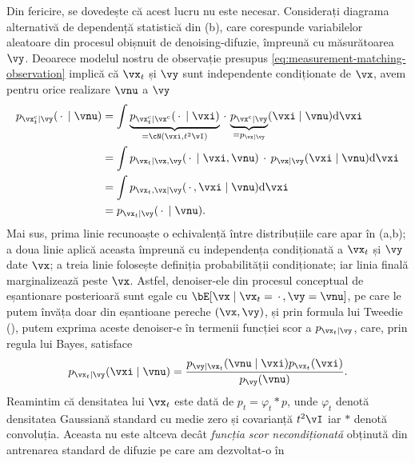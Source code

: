\documentclass[../../book-main_ro.tex]{subfiles}
\begin{document}
Din fericire, se dovedește că acest lucru nu este necesar.
Considerați diagrama alternativă de dependență statistică din
(b), care corespunde variabilelor aleatoare
din procesul obișnuit de denoising-difuzie, împreună cu măsurătoarea $\vy$. 
Deoarece modelul nostru de observație presupus \eqref{eq:measurement-matching-observation}
implică că $\vx_t$ și $\vy$ sunt independente condiționate de $\vx$, avem pentru
orice realizare $\vnu$ a $\vy$
\begin{equation}\label{eq:conditional-denoising-conditioning-order-irrelevant}
  \begin{split}
  p_{\posteriorsample_t\mid \vy}(\spcdot \mid \vnu)
  &= \int
  \underbrace{p_{\posteriorsample_t \mid \posteriorsample}(\spcdot\mid \vxi)}_{=
  \cN(\vxi, t^2 \vI)}
  \spcdot \underbrace{p_{\posteriorsample \mid \vy}}_{= p_{\vx\mid \vy}}(\vxi \mid
  \vnu)
  \odif \vxi
  \\
  &=
  \int p_{\vx_t \mid \vx, \vy}(\spcdot\mid \vxi, \vnu) \spcdot p_{\vx \mid
  \vy}(\vxi\mid \vnu) \odif \vxi
  \\
  &=
  \int p_{\vx_t, \vx \mid \vy}(\spcdot, \vxi \mid \vnu) \odif \vxi
  \\
  &= p_{\vx_t \mid \vy}(\spcdot\mid \vnu).
  \end{split}
\end{equation}
Mai sus, prima linie recunoaște o echivalență între distribuțiile
care apar în  (a,b); a doua linie aplică aceasta
împreună cu independența condiționată a $\vx_t$ și $\vy$ date $\vx$; a
treia linie folosește definiția probabilității condiționate; iar linia finală
marginalizează peste $\vx$.
Astfel, denoiser-ele din procesul conceptual de eșantionare posterioară sunt egale cu
$\bE[\vx \mid \vx_t=\spcdot, \vy=\vnu]$, pe care le putem învăța doar din eșantioane pereche $(\vx,
\vy)$,
și prin formula lui Tweedie (), putem exprima aceste denoiser-e în
termenii funcției scor a $p_{\vx_t \mid \vy}$, care, prin regula lui Bayes,
satisface
\begin{equation}
  p_{\vx_t \mid \vy}(\vxi \mid \vnu) 
  = \frac{p_{\vy \mid \vx_t}(\vnu \mid \vxi) p_{\vx_t}(\vxi)}{p_{\vy}(\vnu)}.
\end{equation}
Reamintim că densitatea lui $\vx_t$ este 
dată de $p_t = \varphi_{t} \ast p$, unde $\varphi_{t}$ denotă
densitatea Gaussiană standard cu medie zero și covarianță $t^2 \vI$ iar $\ast$ denotă
convoluția. Aceasta nu este altceva decât \textit{funcția scor necondiționată}
obținută din antrenarea standard de difuzie pe care am dezvoltat-o în
\end{document}
